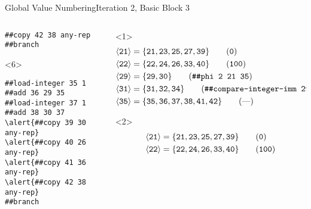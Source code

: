 \documentclass{beamer}
\newcommand{\vn}[1]{\ensuremath{\langle\texttt{#1}\rangle}}
\newcommand{\vreg}[1]{\texttt{#1}}
\begin{document}
\begin{frame}[fragile]{Global Value Numbering}{Iteration 2, Basic Block 3}
\begin{columns}[t,onlytextwidth]
\begin{column}[t]{.5\textwidth}
\begin{onlyenv}
\begin{Verbatim}[frame=single,commandchars=\\\{\}]
##copy 42 38 any-rep
##branch
        \end{Verbatim}
      \end{onlyenv}
      \begin{onlyenv}<6>
        \begin{Verbatim}[frame=single,commandchars=\\\{\}]
##load-integer 35 1
##add 36 29 35
##load-integer 37 1
##add 38 30 37
\alert{##copy 39 30 any-rep}
\alert{##copy 40 26 any-rep}
\alert{##copy 41 36 any-rep}
\alert{##copy 42 38 any-rep}
##branch
        \end{Verbatim}
      \end{onlyenv}
    \end{column}
    \begin{column}{.5\textwidth}
      \begin{onlyenv}<1>
        \begin{align*}
          \vn{21} &= \{\vreg{21},
                       \vreg{23},
                       \vreg{25},
                       \vreg{27},
                       \vreg{39}\} \tag{\texttt{0}} \\
          \vn{22} &= \{\vreg{22},
                       \vreg{24},
                       \vreg{26},
                       \vreg{33},
                       \vreg{40}\} \tag{\texttt{100}} \\
          \vn{29} &= \{\vreg{29},
                       \vreg{30}\} \tag{\texttt{\#\#phi 2 21 35}} \\
          \vn{31} &= \{\vreg{31},
                       \vreg{32},
                       \vreg{34}\} \tag{\texttt{\#\#compare-integer-imm 29 100 cc<}} \\
          \vn{35} &= \{\vreg{35},
                       \vreg{36},
                       \vreg{37},
                       \vreg{38},
                       \vreg{41},
                       \vreg{42}\} \tag{---}
        \end{align*}
      \end{onlyenv}
      \begin{onlyenv}<2>
        \begin{align*}
          \vn{21} &= \{\vreg{21},
                       \vreg{23},
                       \vreg{25},
                       \vreg{27},
                       \vreg{39}\} \tag{\texttt{0}} \\
          \vn{22} &= \{\vreg{22},
                       \vreg{24},
                       \vreg{26},
                       \vreg{33},
                       \vreg{40}\} \tag{\texttt{100}} \\

\end{align*}
\end{onlyenv}
\end{column}
\end{columns}
\end{frame}
\end{document}
